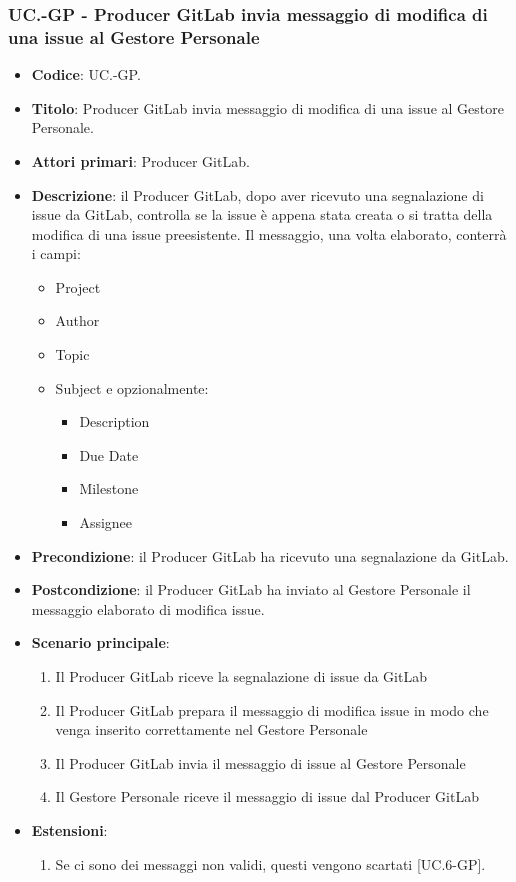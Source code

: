 	\subsubsection{UC\theuccount.\thesubuccount-GP - Producer GitLab invia messaggio di modifica di una issue al Gestore Personale}
		\begin{itemize}
			\item \textbf{Codice}: UC\theuccount.\thesubuccount-GP.
			\item \textbf{Titolo}: Producer GitLab invia messaggio di modifica di una issue al Gestore Personale.
			\item \textbf{Attori primari}: Producer GitLab.
			\item \textbf{Descrizione}: il Producer GitLab, dopo aver ricevuto una segnalazione di issue da GitLab, controlla se la issue è appena stata creata o si tratta della modifica di una issue preesistente. Il messaggio, una volta elaborato, conterrà i campi:
			\begin{itemize}
				\item Project
                \item Author
				\item Topic
				\item Subject e opzionalmente:
				\begin{itemize}
					\item Description
					\item Due Date
					\item Milestone
					\item Assignee
				\end{itemize}
			\end{itemize}
			\item \textbf{Precondizione}: il Producer GitLab ha ricevuto una segnalazione da GitLab.
			\item \textbf{Postcondizione}: il Producer GitLab ha inviato al Gestore Personale il messaggio
			elaborato di modifica issue.
			\item \textbf{Scenario principale}:
			\begin{enumerate}
				\item Il Producer GitLab riceve la segnalazione di issue da GitLab
				\item Il Producer GitLab prepara il messaggio di modifica issue in modo che venga inserito correttamente nel Gestore Personale
				\item Il Producer GitLab invia il messaggio di issue al Gestore Personale
                \item Il Gestore Personale riceve il messaggio di issue dal Producer GitLab
			\end{enumerate}
			\item \textbf{Estensioni}:
			\begin{enumerate}
				\item Se ci sono dei messaggi non validi, questi vengono scartati [UC\theuccount.6-GP].
			\end{enumerate}
		\end{itemize}

